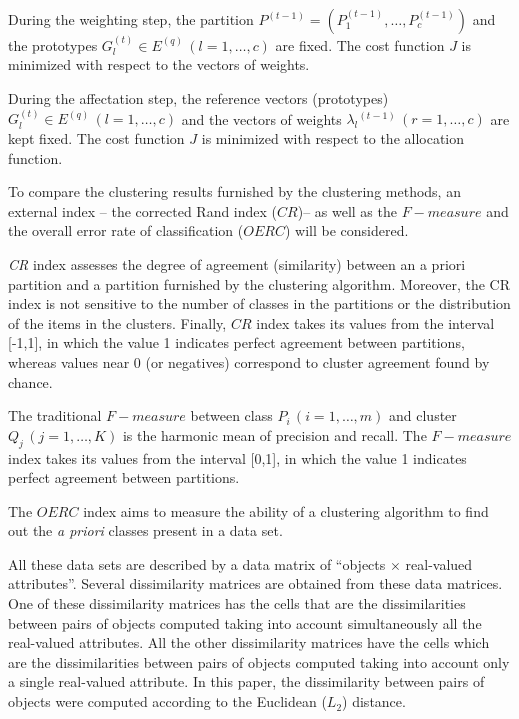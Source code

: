 \documentclass[12pt]{article}
\begin{document}
During the weighting step, the partition $P^{(t-1)}=(P_1^{(t-1)},\ldots,P_c^{(t-1)})$ and the 
prototypes $G_l^{(t)} \in E^{(q)} \, (l=1,\ldots, c)$ are fixed. The cost function $J$ is minimized with respect to the vectors of weights.

During the affectation step, the reference vectors (prototypes) $G_l^{(t)} \in E^{(q)} \, (l=1,\ldots, c)$ and the vectors of weights \mbox{\boldmath$\lambda$\unboldmath$_l$}$^{(t-1)} \, (r=1,\ldots, c)$ are kept fixed. The cost function $J$ is minimized with respect to the allocation function.

To compare the clustering results furnished by the 
clustering methods, an external index -- the corrected Rand index ($CR$)-- 
as well as the $F-measure$ and the overall error rate of classification ($OERC$) will be
considered.

\textit{CR} index assesses the degree of agreement (similarity) between an a priori partition and a partition furnished by the clustering algorithm. Moreover, the CR index
is not sensitive to the number of classes in the partitions or the
distribution of the items in the clusters. Finally, $CR$ index takes its values from the interval [-1,1], in which the value 1 indicates perfect
agreement between partitions, whereas values near 0 (or negatives) correspond
to cluster agreement found by chance.


The traditional $F-measure$ between class $P_i \, (i=1,\ldots,m)$ and cluster $Q_j \, (j=1,\ldots,K)$ is the harmonic mean of precision and recall.
The $F-measure$ index takes its values from the interval [0,1], in which the value 1 indicates perfect
agreement between partitions.

The $OERC$ index aims to measure the ability of a clustering algorithm to find out the \textit{a 
priori} classes present in a data set.

All these data sets are described by a data matrix of ``objects $\times$ real-valued attributes''.
Several dissimilarity matrices are obtained from these data matrices. One of these dissimilarity matrices has the cells that are the dissimilarities between pairs of objects computed taking into account simultaneously all the real-valued attributes. All the other dissimilarity matrices have the cells which are the dissimilarities between pairs of objects computed taking into account only a single real-valued attribute. In this paper, the dissimilarity between pairs of objects were computed according to the Euclidean ($L_2$) distance.
\end{document}
